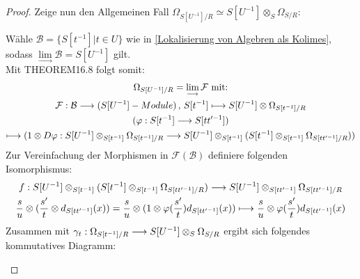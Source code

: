 \documentclass[10pt,a4paper]{report}
\newcommand{\comment}[1]{}
\newcommand{\functionfront}[3]{\nolinebreak{#1:#2 \longrightarrow #3}}
\newcommand{\function}[5]{\nolinebreak{#1:#2 \longrightarrow #3 \, , \, #4 \longmapsto #5}}
\newcommand{\divR}[2]{\Omega_{#1/#2}}
\newcommand{\Tensor}[3]{#1 \otimes_{#2} #3}
\newcommand{\tensor}[3]{#1 \otimes #3}
\newcommand{\lok}[2]{#1 [#2^{-1}]}
\newcommand{\colimes}[0]{\lim\limits_{ \longrightarrow }}
\begin{document}
\begin{proof}
Zeige nun den Allgemeinen Fall $\divR{\lok{S}{U}}{R} \simeq \Tensor{\lok{S}{U}}{S}{\divR{S}{R}}$:

Wähle $\mathcal{B} = \lbrace \lok{S}{t} \vert t \in U \rbrace$ wie in \cref{Lokalisierung von Algebren als Kolimes}, sodass $\colimes \mathcal{B} = \lok{S}{U}$ gilt.\\
Mit THEOREM16.8 \comment{\label{THEOREM16.8}} folgt somit:
\begin{gather*}
\divR{\lok{S}{U}}{R}  = \colimes{\mathcal{F}} \text{ mit:}\\
\function{\mathcal{F}}{\mathcal{B}}{(\lok{S}{U} - Module)}{\lok{S}{t}}{\tensor{\lok{S}{U}}{\lok{S}{t}}{\divR{\lok{S}{t}}{R}}}\\
( \functionfront{\varphi}{\lok{S}{t}}{\lok{S}{tt'}} )\\ \longmapsto 
( \functionfront{\tensor{1}{\lok{S}{t}}{D\varphi}}{ \Tensor{\lok{S}{U}}{\lok{S}{t}}{\divR{\lok{S}{t}}{R}}}{ \Tensor{\lok{S}{U}}{\lok{S}{t}}{( \Tensor{\lok{S}{t}}{\lok{S}{t}}{\divR{\lok{S}{tt'}}{R}})}} )
\end{gather*}
Zur Vereinfachung der Morphismen in $\mathcal{F}(\mathcal{B})$ definiere folgenden Isomorphismus:
\begin{gather*}
\functionfront{f}{ \Tensor{\lok{S}{U}}{\lok{S}{t}}{( \Tensor{\lok{S}{t}}{\lok{S}{t}}{\divR{\lok{S}{tt'}}{R}})}}{\Tensor{\lok{S}{U}}{\lok{S}{tt'}}{\divR{\lok{S}{tt'}}{R}}}\\
\tensor{\frac{s}{u}}{\lok{S}{t}}{( \tensor{\frac{s'}{t}}{\lok{S}{t}}{d_{\lok{S}{tt'}}(x)} )}
= \tensor{\frac{s}{u}}{\lok{S}{t}}{( \tensor{1}{\lok{S}{t}}{\varphi(\frac{s'}{t})d_{\lok{S}{tt'}}(x)} )}
\longmapsto \tensor{\frac{s}{u}}{\lok{S}{tt'}}{\varphi(\frac{s'}{t})d_{\lok{S}{tt'}}(x)}
\end{gather*}
Zusammen mit $\functionfront{\gamma_t}{\divR{\lok{S}{t}}{R}}{\Tensor{\lok{S}{U}}{S}{\divR{S}{R}}}$ ergibt sich folgendes kommutatives Diagramm:
\begin{center}
\end{center}
\end{proof}
\end{document}
